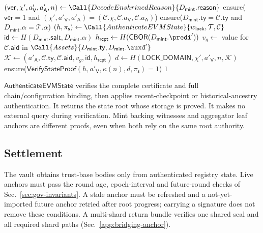 \begin{algorithm}[!htbp]
\caption{Enshrined Backing Mint-Reason Verification}\label{alg:bridge-backing-enshrined}
\begin{algorithmic}[0]
 \State $(\mathsf{ver},\chi',a'_\mathsf{V},a'_\mathsf{A},n)\gets\Call{DecodeEnshrinedReason}{D_\mathsf{mint}.\mathsf{reason}}$
 \State ensure($\mathsf{ver}=1$ and $(\chi',a'_\mathsf{V},a'_\mathsf{A})=(\mathcal{C}.\chi,\mathcal{C}.a_\mathsf{V},\mathcal{C}.a_\mathsf{A})$)
 \State ensure($D_\mathsf{mint}.\mathsf{ty}=\mathcal{C}.\mathsf{ty}$ and $D_\mathsf{mint}.\alpha=\mathcal{T}.\alpha$)
 \State $(h,\pi_\mathsf{s})\gets\Call{AuthenticateEVMState}{w_\mathsf{lock},\mathcal{T},\mathcal{C}}$
 \State $\mathsf{id}\gets H(D_\mathsf{mint}.\mathsf{salt},D_\mathsf{mint}.\alpha)$
 \State $h_\mathsf{rcpt}\gets H(\mathsf{CBOR}(D_\mathsf{mint}.\predi'))$
 \State $v_g\gets$ value for $\mathcal{C}.\mathsf{aid}$ in $\Call{Assets}{D_\mathsf{mint}.\mathsf{ty},D_\mathsf{mint}.\auxd'}$
 \State $\mathcal{K}\gets(a'_\mathsf{A},\mathcal{C}.\mathsf{ty},\mathcal{C}.\mathsf{aid},v_g,\mathsf{id},h_\mathsf{rcpt})$
 \State $d\gets H(\mathsf{LOCK\_DOMAIN},\chi',a'_\mathsf{V},n,\mathcal{K})$
 \State ensure($\mathsf{VerifyStateProof}(h,a'_\mathsf{V},\kappa(n),d,\pi_\mathsf{s})=1$)
 \State \Return $1$
\EndFunction
\end{algorithmic}
\end{algorithm}

$\mathsf{AuthenticateEVMState}$ verifies the complete certificate and full chain/configuration binding, then applies recent-checkpoint or historical-ancestry authentication. It returns the state root whose storage is proved. It makes no external query during verification. Mint backing witnesses and aggregator leaf anchors are different proofs, even when both rely on the same root authority.

\subsection{Settlement}

The vault obtains trust-base bodies only from authenticated registry state. Live anchors must pass the round age, epoch-interval and future-round checks of Sec.~\ref{sec:gov-invariants}. A stale anchor must be refreshed and a not-yet-imported future anchor retried after root progress; carrying a signature does not remove these conditions. A multi-shard return bundle verifies one shared seal and all required shard paths (Sec.~\ref{app:bridging-anchor}).

